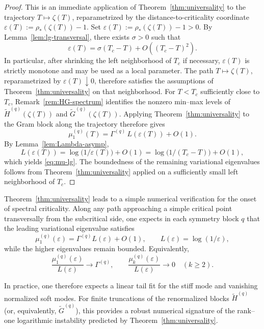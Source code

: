\documentclass[11pt]{amsart}
\numberwithin{equation}{section}
\theoremstyle{plain}
\theoremstyle{definition}
\theoremstyle{remark}
\begin{document}
\begin{proof}
	This is an immediate application of Theorem~\ref{thm:universality} to the
	trajectory \(T\mapsto\zeta(T)\), reparametrized by the distance-to-criticality
	coordinate \(\varepsilon(T):=\rho_*(\zeta(T))-1\).
	Set $\varepsilon(T):=\rho_*(\zeta(T))-1>0$.
	By Lemma~\ref{lem:lg-transversal}, there exists $\sigma>0$ such that
	\begin{equation}\label{eq:eps-transversal}
		\varepsilon(T)=\sigma(T_c-T)+O((T_c-T)^2).
	\end{equation}
	In particular, after shrinking the left neighborhood of \(T_c\) if
	necessary, \(\varepsilon(T)\) is strictly monotone and may be used as a
	local parameter. The path \(T\mapsto\zeta(T)\), reparametrized by
	\(\varepsilon(T)\downarrow0\), therefore satisfies the assumptions of
	Theorem~\ref{thm:universality} on that neighborhood.
	For $T<T_c$ sufficiently close to $T_c$, Remark~\ref{rem:HG-spectrum}
	identifies the nonzero min--max levels of
	$\widetilde H^{(q)}(\zeta(T))$ and $\widetilde G^{(q)}(\zeta(T))$.
	Applying Theorem~\ref{thm:universality} to the Gram block along the
	trajectory therefore gives
	\[
		\mu_1^{(q)}(T)
		=
		\Gamma^{(q)}\,L(\varepsilon(T))+O(1).
	\]
	By Lemma~\ref{lem:Lambda-asymp},
	\[
		L(\varepsilon(T))
		=\log\!\bigl(1/\varepsilon(T)\bigr)+O(1)
		=\log\!\bigl(1/(T_c-T)\bigr)+O(1),
	\]
	which yields \eqref{eq:mu-lg}.
	The boundedness of the remaining variational eigenvalues follows from
	Theorem~\ref{thm:universality} applied on a sufficiently small left
	neighborhood of $T_c$.
\end{proof}

	Theorem~\ref{thm:universality} leads to a simple numerical verification for the
	onset of spectral criticality.  Along any path approaching a simple critical
	point transversally from the subcritical side, one expects in each symmetry
	block \(q\) that the leading variational eigenvalue satisfies
	\[
		\mu_1^{(q)}(\varepsilon)=\Gamma^{(q)}L(\varepsilon)+O(1),
		\qquad
		L(\varepsilon)=\log(1/\varepsilon),
	\]
	while the higher eigenvalues remain bounded.  Equivalently,
	\[
		\frac{\mu_1^{(q)}(\varepsilon)}{L(\varepsilon)}\to \Gamma^{(q)},
		\qquad
		\frac{\mu_k^{(q)}(\varepsilon)}{L(\varepsilon)}\to 0
		\quad (k\ge2).
	\]

	In practice, one therefore expects a linear tail fit for the stiff mode and
	vanishing normalized soft modes.  For finite truncations of the renormalized
	blocks \(\widetilde H^{(q)}\) (or, equivalently, \(\widetilde G^{(q)}\)),
	this provides a robust numerical signature of the rank--one logarithmic
	instability predicted by Theorem~\ref{thm:universality}.
\end{document}
